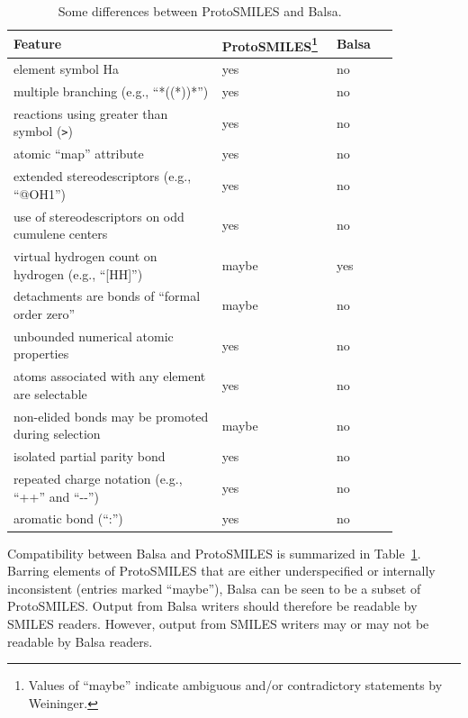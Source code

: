 \documentclass{article}
\def\ttt{\texttt}
\begin{document}
\begin{table}
\begin{minipage}{\textwidth}
\renewcommand*\footnoterule{}
    \caption{Some differences between ProtoSMILES and Balsa.}
    \centering
    \begin{tabular}{p{0.50\linewidth} p{0.20\linewidth} p{0.15\linewidth}}
        \hline
        Feature & ProtoSMILES\footnote{Values of \enquote{maybe} indicate ambiguous and/or contradictory statements by Weininger.} & Balsa \\
        \hline
        element symbol Ha & yes & no \\
        multiple branching (e.g., \enquote{*((*))*}) & yes & no \\
        reactions using greater than symbol (\ttt{>}) & yes & no \\
        atomic \enquote{map} attribute & yes & no \\
        extended stereodescriptors (e.g., \enquote{@OH1}) & yes & no \\
        use of stereodescriptors on odd cumulene centers & yes & no \\
        virtual hydrogen count on hydrogen (e.g., \enquote{[HH]}) & maybe & yes \\
        detachments are bonds of \enquote{formal order zero} & maybe & no \\
        unbounded numerical atomic properties & yes & no \\
        atoms associated with any element are selectable & yes & no \\
        non-elided bonds may be promoted during selection & maybe & no \\
        isolated partial parity bond & yes & no \\
        repeated charge notation (e.g., \enquote{++} and \enquote{-{}-}) & yes & no \\
        aromatic bond (\enquote{:}) & yes & no \\
        \hline
    \end{tabular}
    \label{table:feature-comparison}
\end{minipage}
\end{table}

Compatibility between Balsa and ProtoSMILES is summarized in Table~\ref{table:feature-comparison}. Barring elements of ProtoSMILES that are either underspecified or internally inconsistent (entries marked \enquote{maybe}), Balsa can be seen to be a subset of ProtoSMILES. Output from Balsa writers should therefore be readable by SMILES readers. However, output from SMILES writers may or may not be readable by Balsa readers.
\end{document}
